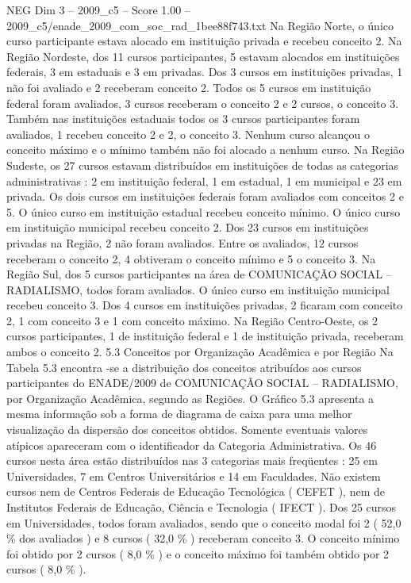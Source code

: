 \begin{textsample}{NEG Dim 3 – 2009\_c5 – Score 1.00 – 2009\_c5/enade\_2009\_com\_soc\_rad\_1bee88f743.txt}
Na Região Norte, o único curso participante estava alocado em instituição privada e recebeu conceito 2.
Na Região Nordeste, dos 11 cursos participantes, 5 estavam alocados em instituições federais, 3 em estaduais e 3 em privadas.
Dos 3 cursos em instituições privadas, 1 não foi avaliado e 2 receberam conceito 2.
Todos os 5 cursos em instituição federal foram avaliados, 3 cursos receberam o conceito 2 e 2 cursos, o conceito 3.
Também nas instituições estaduais todos os 3 cursos participantes foram avaliados, 1 recebeu conceito 2 e 2, o conceito 3.
Nenhum curso alcançou o conceito máximo e o mínimo também não foi alocado a nenhum curso.
Na Região Sudeste, os 27 cursos estavam distribuídos em instituições de todas as categorias administrativas : 2 em instituição federal, 1 em estadual, 1 em municipal e 23 em privada.
Os dois cursos em instituições federais foram avaliados com conceitos 2 e 5.
O único curso em instituição estadual recebeu conceito mínimo.
O único curso em instituição municipal recebeu conceito 2.
Dos 23 cursos em instituições privadas na Região, 2 não foram avaliados.
Entre os avaliados, 12 cursos receberam o conceito 2, 4 obtiveram o conceito mínimo e 5 o conceito 3.
Na Região Sul, dos 5 cursos participantes na área de COMUNICAÇÃO SOCIAL – RADIALISMO, todos foram avaliados.
O único curso em instituição municipal recebeu conceito 3.
Dos 4 cursos em instituições privadas, 2 ficaram com conceito 2, 1 com conceito 3 e 1 com conceito máximo.
Na Região Centro-Oeste, os 2 cursos participantes, 1 de instituição federal e 1 de instituição privada, receberam ambos o conceito 2. 5.3 Conceitos por Organização Acadêmica e por Região Na Tabela 5.3 encontra -se a distribuição dos conceitos atribuídos aos cursos participantes do ENADE/2009 de COMUNICAÇÃO SOCIAL – RADIALISMO, por Organização Acadêmica, segundo as Regiões.
O Gráfico 5.3 apresenta a mesma informação sob a forma de diagrama de caixa para uma melhor visualização da dispersão dos conceitos obtidos.
Somente eventuais valores atípicos apareceram com o identificador da Categoria Administrativa.
Os 46 cursos nesta área estão distribuídos nas 3 categorias mais freqüentes : 25 em Universidades, 7 em Centros Universitários e 14 em Faculdades.
Não existem cursos nem de Centros Federais de Educação Tecnológica ( CEFET ), nem de Institutos Federais de Educação, Ciência e Tecnologia ( IFECT ).
Dos 25 cursos em Universidades, todos foram avaliados, sendo que o conceito modal foi 2 ( 52,0 \% dos avaliados ) e 8 cursos ( 32,0 \% ) receberam conceito 3.
O conceito mínimo foi obtido por 2 cursos ( 8,0 \% ) e o conceito máximo foi também obtido por 2 cursos ( 8,0 \% ).

\end{textsample}
